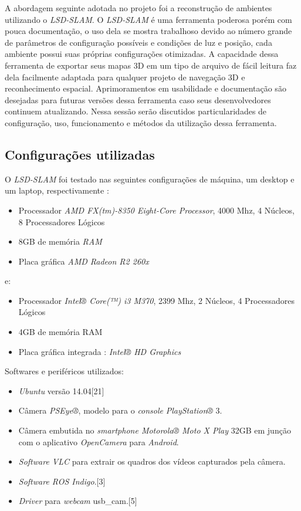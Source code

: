 A abordagem seguinte adotada no projeto foi a reconstrução de ambientes utilizando o \textit{LSD-SLAM}. O \textit{LSD-SLAM} é uma ferramenta poderosa porém com pouca documentação, o uso dela se mostra trabalhoso devido ao número grande de parâmetros de configuração possíveis e condições de luz e posição, cada ambiente possui suas próprias configurações otimizadas. A capacidade dessa ferramenta de exportar seus mapas 3D em um tipo de arquivo de fácil leitura faz dela facilmente adaptada para qualquer projeto de navegação 3D e reconhecimento espacial. Aprimoramentos em usabilidade e documentação são desejadas para futuras versões dessa ferramenta caso seus desenvolvedores continuem atualizando. Nessa sessão serão discutidos particularidades de configuração, uso, funcionamento e métodos da utilização dessa ferramenta.

\subsection{Configurações utilizadas}

O \textit{LSD-SLAM} foi testado nas seguintes configurações de máquina, um desktop e um laptop, respectivamente :

\begin{itemize}
	\item{Processador	\textit{AMD FX(tm)-8350 Eight-Core Processor}, 4000 Mhz, 4 Núcleos, 8 Processadores Lógicos}
	\item{8GB de memória \textit{RAM}}
	\item{Placa gráfica \textit{AMD Radeon R2 260x}}
\end{itemize}

e:

\begin{itemize}
	\item{Processador \textit{Intel® Core(™) i3 M370}, 2399 Mhz, 2 Núcleos, 4 Processadores Lógicos}
	\item{4GB de memória RAM}
	\item{Placa gráfica integrada : \textit{Intel® HD Graphics}}
\end{itemize}	

Softwares e periféricos utilizados:

\begin{itemize}
	\item{\textit{Ubuntu} versão 14.04[21]}
	\item{Câmera \textit{PSEye®}, modelo para o \textit{console} \textit{PlayStation®} 3.}
	\item{Câmera embutida no \textit{smartphone Motorola® Moto X Play} 32GB em junção com o aplicativo \textit{OpenCamera} para \textit{Android}.}
	\item{\textit{Software VLC} para extrair os quadros dos vídeos capturados pela câmera.}
	\item{\textit{Software ROS Indigo}.[3]}
	\item{\textit{Driver} para \textit{webcam} usb\_cam.[5]}
\end{itemize}

